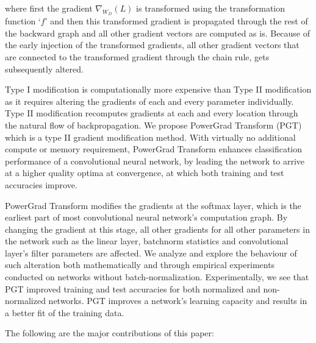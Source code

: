 \documentclass[times,sort&compress]{elsarticle}
\begin{document}
where first the gradient $\nabla_{W_D}(L)$ is transformed using the transformation
function `$f$' and then this transformed gradient is propagated through the rest of the
backward graph and all other gradient vectors are computed as is. Because of the early
injection of the transformed gradients, all other gradient vectors that are connected to
the transformed gradient through the chain rule, gets subsequently altered.

Type I modification is computationally more expensive than Type II modification as it
requires altering the gradients of each and every parameter individually. Type II
modification recomputes gradients at each and every location through the natural flow of
backpropagation. We propose PowerGrad Transform (PGT) which is a type II gradient
modification method. With virtually no additional compute or memory requirement,
PowerGrad Transform enhances classification performance of a convolutional neural
network, by leading the network to arrive at a higher quality optima at convergence, at
which both training and test accuracies improve.


PowerGrad Transform modifies the gradients at the softmax layer, which is the earliest
part of most convolutional neural network's computation graph. By changing the gradient
at this stage, all other gradients for all other parameters in the network such as the
linear layer, batchnorm statistics and convolutional layer's filter parameters are
affected. We analyze and explore the behaviour of such alteration both mathematically
and through empirical experiments conducted on networks without batch-normalization.
Experimentally, we see that PGT improved training and test accuracies for both
normalized and non-normalized networks. PGT improves a network's learning capacity and
results in a better fit of the training data.



The following are the major contributions of this paper:
\end{document}
